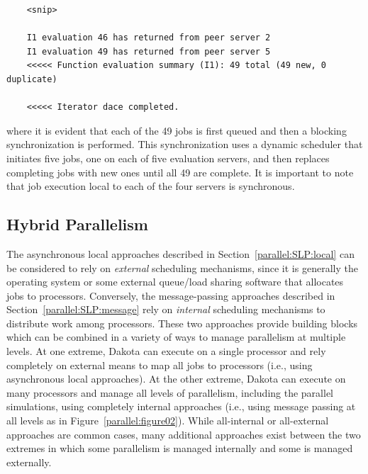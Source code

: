 \begin{small}
\begin{verbatim}
    <snip>
    
    I1 evaluation 46 has returned from peer server 2
    I1 evaluation 49 has returned from peer server 5
    <<<<< Function evaluation summary (I1): 49 total (49 new, 0 duplicate)
    
    <<<<< Iterator dace completed.
\end{verbatim}
\end{small}
where it is evident that each of the 49 jobs is first queued and then
a blocking synchronization is performed.  This synchronization uses a
dynamic scheduler that initiates five jobs, one on each of five evaluation
servers, and then replaces completing jobs with new ones until all 49 are 
complete.  It is important to note that job execution local to each of the 
four servers is synchronous.


\subsection{Hybrid Parallelism}\label{parallel:SLP:hybrid}

The asynchronous local approaches described in
Section~\ref{parallel:SLP:local} can be considered to rely on
\emph{external} scheduling mechanisms, since it is generally the
operating system or some external queue/load sharing software that
allocates jobs to processors. Conversely, the message-passing
approaches described in Section~\ref{parallel:SLP:message} rely on
\emph{internal} scheduling mechanisms to distribute work among
processors. These two approaches provide building blocks which can be
combined in a variety of ways to manage parallelism at multiple
levels. At one extreme, Dakota can execute on a single processor and
rely completely on external means to map all jobs to processors (i.e.,
using asynchronous local approaches). At the other extreme, Dakota can
execute on many processors and manage all levels of parallelism,
including the parallel simulations, using completely internal
approaches (i.e., using message passing at all levels as in
Figure~\ref{parallel:figure02}). While all-internal or all-external
approaches are common cases, many additional approaches exist between
the two extremes in which some parallelism is managed internally and
some is managed externally.

